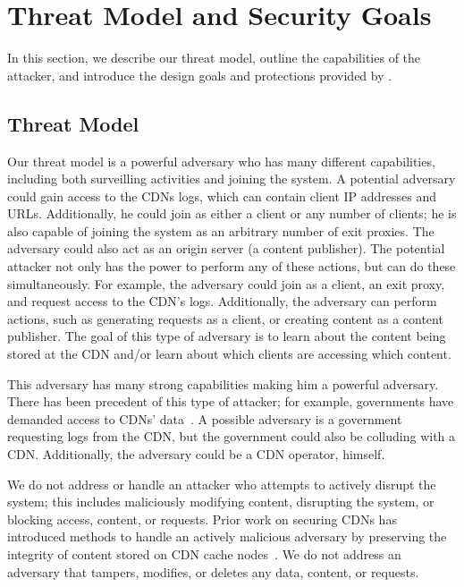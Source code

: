 \section{Threat Model and Security Goals}
\label{sec:threat}
In this section, we describe our threat model, outline the capabilities of the 
attacker, and introduce the design goals and protections provided by \system{}.

\subsection{Threat Model}
\label{sec:attacker}

Our threat model is a powerful adversary who has many different capabilities, including 
both surveilling activities and joining the system.  A potential adversary could gain 
access to the CDNs logs, which can contain client IP addresses and URLs.  Additionally, 
he could join \system{} as either a client or any number of clients; he is also capable 
of joining the system as an arbitrary number of exit proxies.  The adversary could 
also act as an origin server (a content publisher).  The potential attacker not only has the 
power to perform any of these actions, but can do these simultaneously.  For example, the 
adversary could join as a client, an exit proxy, and request access to the CDN's logs.  Additionally, 
the adversary can perform actions, such as generating requests as a client, or creating content 
as a content publisher. The goal of this type of adversary is to learn about the content being stored 
at the CDN and/or learn about which clients are accessing which content.  

This adversary has many strong capabilities making him a powerful adversary.  There has been 
precedent of this type of attacker; for example, governments have demanded access to CDNs' 
data~\cite{cloudflare_nsl}.  A possible adversary is a government requesting logs from the CDN, but 
the government could also be colluding with a CDN.  Additionally, the adversary could be a CDN operator, 
himself.  

We do not address or handle an attacker who attempts to actively disrupt the system; this includes maliciously 
modifying content, disrupting the system, or blocking access, content, or requests.  Prior work on securing 
CDNs has introduced methods to handle an actively malicious adversary by preserving the integrity of content 
stored on CDN cache nodes~\cite{levy2015stickler}.  We do not address an adversary that tampers, modifies, or 
deletes any data, content, or requests.  

